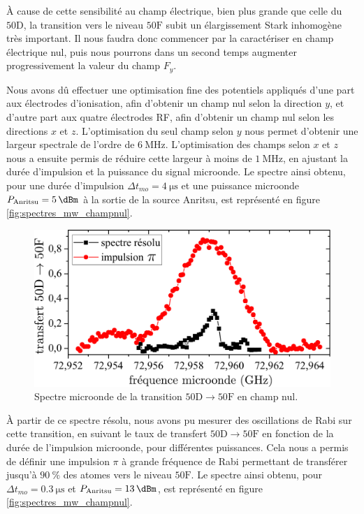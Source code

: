 \`A cause de cette sensibilité au champ électrique, bien plus grande que celle du $\mathrm{50D}$, la transition vers le niveau $\mathrm{50F}$ subit un élargissement Stark inhomogène très important.
Il nous faudra donc commencer par la caractériser en champ électrique nul, puis nous pourrons dans un second temps augmenter progressivement la valeur du champ $F_y$.

Nous avons dû effectuer une optimisation fine des potentiels appliqués d'une part aux électrodes d'ionisation, afin d'obtenir un champ nul selon la direction $y$, et d'autre part aux quatre électrodes RF, afin d'obtenir un champ nul selon les directions $x$ et $z$.
L'optimisation du seul champ selon $y$ nous permet d'obtenir une largeur spectrale de l'ordre de $\SI{6}{\MHz}$.
L'optimisation des champs selon $x$ et $z$ nous a ensuite permis de réduire cette largeur à moins de $\SI{1}{\MHz}$, en ajustant la durée d'impulsion et la puissance du signal microonde.
Le spectre ainsi obtenu, pour une durée d'impulsion $\Delta t _{mo} = \SI{4}{\us}$ et une puissance microonde $P_{\text{Anritsu}} = \SI{5}{\dBm}$ à la sortie de la source Anritsu, est représenté en figure \eqref{fig:spectres_mw_champnul}.

\begin{figure}[!h]
\centering
\includegraphics[width=0.85\linewidth]{figures/circulars/spectres_mw_champnul}
\caption[Spectre microonde de la transition $\mathrm{50D\rightarrow 50F}$ en champ nul]{
Spectre microonde de la transition $\mathrm{50D\rightarrow 50F}$ en champ nul.
}
\label{fig:spectres_mw_champnul}
\end{figure}

À partir de ce spectre résolu, nous avons pu mesurer des oscillations de Rabi sur cette transition, en suivant le taux de transfert $\mathrm{50D \rightarrow 50F}$ en fonction de la durée de l'impulsion microonde, pour différentes puissances.
Cela nous a permis de définir une impulsion $\pi$ à grande fréquence de Rabi permettant de transférer jusqu'à $\SI{90}{\percent}$ des atomes vers le niveau $\mathrm{50F}$.
Le spectre ainsi obtenu, pour $\Delta t_{mo} = \SI{0.3}{\us}$ et $P_{\text{Anritsu}} = \SI{13}{\dBm}$, est représenté en figure \eqref{fig:spectres_mw_champnul}.

